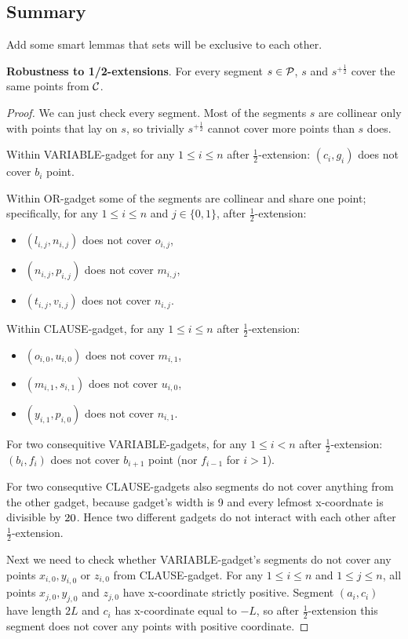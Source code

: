 \subsection{Summary}

Add some smart lemmas that sets will be exclusive to each other.

\begin{lemma}
\textbf{Robustness to 1/2-extensions}. For every segment $s \in \mathcal{P}$,
$s$ and $s^{+\frac{1}{2}}$ cover the same points from $\mathcal{C}$.
\end{lemma}

\begin{proof}
We can just check every segment. Most of the segments $s$
are collinear only with points that lay on $s$,
so trivially $s^{+\frac{1}{2}}$ cannot cover more points than $s$ does.

Within VARIABLE-gadget for any $1 \le i \le n$ after $\frac{1}{2}$-extension:
$(c_i,g_i)$ does not cover $b_i$ point.

Within OR-gadget some of the segments are collinear and share one point;
specifically, for any $1 \le i \le n$ and $j \in \{0,1\}$, after $\frac{1}{2}$-extension:
\begin{itemize}
\item $(l_{i,j}, n_{i,j})$ does not cover $o_{i,j}$,
\item $(n_{i,j}, p_{i,j})$ does not cover $m_{i,j}$,
\item $(t_{i,j}, v_{i,j})$ does not cover $n_{i,j}$.
\end{itemize}
Within CLAUSE-gadget, for any $1 \le i \le n$ after $\frac{1}{2}$-extension:
\begin{itemize}
\item $(o_{i,0}, u_{i,0})$ does not cover $m_{i,1}$,
\item $(m_{i,1}, s_{i,1})$ does not cover $u_{i,0}$,
\item $(y_{i,1}, p_{i,0})$ does not cover $n_{i,1}$.
\end{itemize}
For two consequitive VARIABLE-gadgets, for any $1 \le i < n$ after $\frac{1}{2}$-extension:
$(b_i, f_i)$ does not cover $b_{i+1}$ point (nor $f_{i-1}$ for $i>1$).

For two consequtive CLAUSE-gadgets also segments do not cover anything
from the other gadget, because gadget's width is 9 and
every lefmost x-coordnate is divisible by $20$.
Hence two different gadgets do not interact with each other
after $\frac{1}{2}$-extension.

Next we need to check whether VARIABLE-gadget's segments
do not cover any points $x_{i,0}, y_{i,0}$ or $z_{i,0}$ from CLAUSE-gadget.
For any $1 \le i \le n$ and $1 \le j \le n$, all points $x_{j,0}, y_{j,0}$ and $z_{j,0}$
have x-coordinate strictly positive. Segment $(a_i, c_i)$ have length $2L$
and $c_i$ has x-coordinate equal to $-L$, so after $\frac{1}{2}$-extension
this segment does not cover any points with positive coordinate.


\end{proof}


